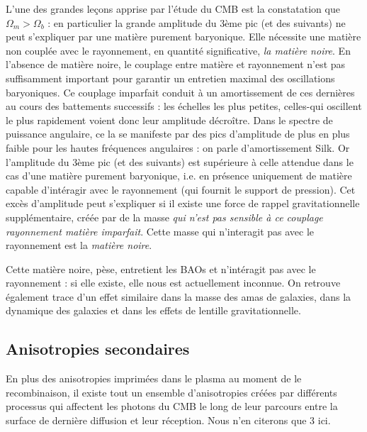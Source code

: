 L'une des grandes leçons apprise par l'étude du CMB est la constatation que $\Omega_m>\Omega_b$ : en particulier la grande amplitude du 3ème pic (et des suivants) ne peut s'expliquer par une matière purement baryonique. Elle nécessite une matière non couplée avec le rayonnement, en quantité significative, \textit{la matière noire}. En l'absence de matière noire, le couplage entre matière et rayonnement n'est pas suffisamment important pour garantir un entretien maximal des oscillations baryoniques. Ce couplage imparfait conduit à un amortissement de ces dernières au cours des battements successifs : les échelles les plus petites, celles-qui oscillent le plus rapidement voient donc leur amplitude décroître. Dans le spectre de puissance angulaire, ce la se manifeste par des pics d'amplitude de plus en plus faible pour les hautes fréquences angulaires : on parle d'amortissement Silk. Or l'amplitude du 3ème pic (et des suivants) est supérieure à celle attendue dans le cas d'une matière  purement baryonique, i.e. en présence uniquement de matière capable d'intéragir avec le rayonnement (qui fournit le support de pression). Cet excès d'amplitude peut s'expliquer si il existe une force de rappel gravitationnelle supplémentaire, créée par de la masse \textit{qui n'est pas sensible à ce couplage rayonnement matière imparfait}. Cette masse qui n'interagit pas avec le rayonnement est la \textit{matière noire}.

Cette matière noire, pèse, entretient les BAOs et n'intéragit pas avec le rayonnement : si elle existe, elle nous est actuellement inconnue. On retrouve également trace d'un effet similaire dans la masse des amas de galaxies, dans la dynamique des galaxies et dans les effets de lentille gravitationnelle.

\subsection{Anisotropies secondaires}
En plus des anisotropies imprimées dans le plasma au moment de le recombinaison, il existe tout un ensemble d'anisotropies créées par différents processus qui affectent les photons du CMB le long de leur parcours entre la surface de dernière diffusion et leur réception. Nous n'en citerons que 3 ici.

